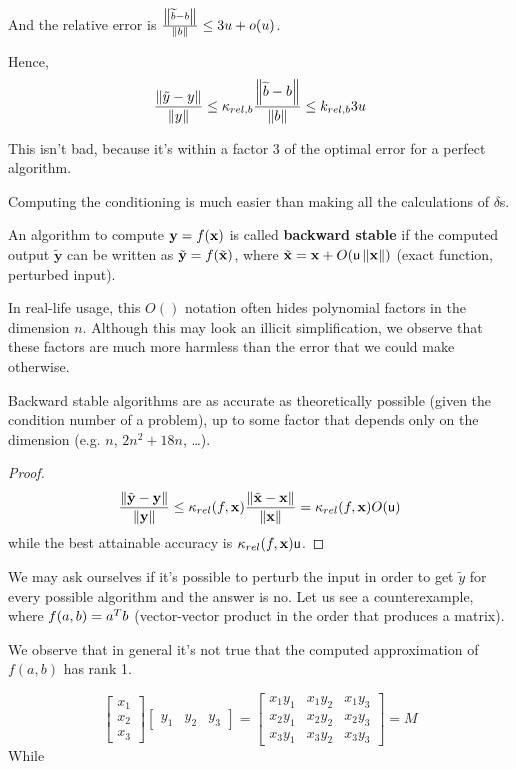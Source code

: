 \documentclass[ComputationalMathematics.tex]{subfiles}
\begin{document}
And the relative error is $\frac{\left\lVert\widetilde{b}-b\right\rVert}{\left\lVert b\right\rVert} \leq 3u + o(u)$.

Hence,
\[
  \frac{\left\lVert\tilde{y}-y\right\rVert}{\left\lVert y\right\rVert} \leq \kappa_{rel, b} \frac{\left\lVert\widetilde{b}-b\right\rVert}{\left\lVert b\right\rVert} \le k_{rel, b} 3u
\]

This isn't bad, because it's within a factor $3$ of the optimal error for a perfect algorithm.

Computing the conditioning is much easier than making all the calculations of $\delta$s.

\begin{definition}
  An algorithm to compute $\mathbf{y}=f(\mathbf{x})$ is called \textbf{backward stable} if the computed output $\tilde{\mathbf{y}}$ can be written as $\tilde{\mathbf{y}} = f(\tilde{\mathbf{x}})$, where $\tilde{\mathbf{x}} = \mathbf{x} + O(\mathsf{u} \left\lVert\mathbf{x}\right\rVert)$ (exact function, perturbed input).
\end{definition}

\begin{obs}
In real-life usage, this $O()$ notation often hides polynomial factors in the dimension $n$. Although this may look an illicit simplification, we observe that these factors are much more harmless than the error that we could make otherwise.
\end{obs}

\begin{theorem}
Backward stable algorithms are as accurate as theoretically possible (given the condition number of a problem), up to some factor that depends only on the dimension (e.g. $n$, $2n^2+18n$, \dots).
\end{theorem}

\begin{proof}
\[
\frac{\left\lVert\tilde{\mathbf{y}} - \mathbf{y}\right\rVert}{\left\lVert\mathbf{y}\right\rVert} \leq \kappa_{rel}(f,\mathbf{x})\frac{\left\lVert\tilde{\mathbf{x}}-\mathbf{x}\right\rVert}{\left\lVert\mathbf{x}\right\rVert} = \kappa_{rel}(f,\mathbf{x}) O(\mathsf{u})
\]
while the best attainable accuracy is $\kappa_{rel}(f,\mathbf{x})\mathsf{u}$.
\end{proof}


We may ask ourselves if it's possible to perturb the input in order to get $\widetilde{y}$ for every possible algorithm and the answer is no. Let us see a counterexample, where $f(a, b) = {a}^{T} b$ (vector-vector product in the order that produces a matrix).

We observe that in general it's not true that the computed approximation of $f(a, b)$ has rank 1.

\[
\begin{bmatrix}
    x_1\\ x_2\\ x_3
\end{bmatrix}
\begin{bmatrix}
    y_1 & y_2 & y_3
\end{bmatrix}
=
\begin{bmatrix}
    x_1 y_1 & x_1 y_2 & x_1 y_3\\
    x_2 y_1 & x_2 y_2 & x_2 y_3\\
    x_3 y_1 & x_3 y_2 & x_3 y_3
\end{bmatrix}
=
M
\]
While
\end{document}
